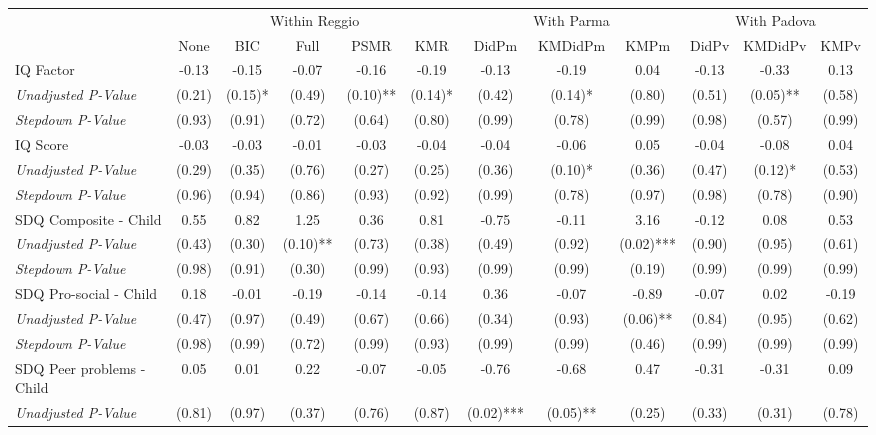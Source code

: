 \begin{tabular}{l c c c c c c c c c c c}
\toprule
& \multicolumn{5}{c}{Within Reggio} & \multicolumn{3}{c}{With Parma} & \multicolumn{3}{c}{With Padova} \\\cmidrule(lr){2-6} \cmidrule(lr){7-9} \cmidrule(lr){10-12}
 & None & BIC & Full & PSMR & KMR & DidPm & KMDidPm & KMPm & DidPv & KMDidPv & KMPv \\
\midrule
IQ Factor & -0.13 & -0.15 & -0.07 & -0.16 & -0.19 & -0.13 & -0.19 & 0.04 & -0.13 & -0.33 & 0.13 \\
\quad \textit{Unadjusted P-Value} & (0.21) & (0.15)* & (0.49) & (0.10)** & (0.14)* & (0.42) & (0.14)* & (0.80) & (0.51) & (0.05)** & (0.58) \\
\quad \textit{Stepdown P-Value} & (0.93) & (0.91) & (0.72) & (0.64) & (0.80) & (0.99) & (0.78) & (0.99) & (0.98) & (0.57) & (0.99) \\
IQ Score & -0.03 & -0.03 & -0.01 & -0.03 & -0.04 & -0.04 & -0.06 & 0.05 & -0.04 & -0.08 & 0.04 \\
\quad \textit{Unadjusted P-Value} & (0.29) & (0.35) & (0.76) & (0.27) & (0.25) & (0.36) & (0.10)* & (0.36) & (0.47) & (0.12)* & (0.53) \\
\quad \textit{Stepdown P-Value} & (0.96) & (0.94) & (0.86) & (0.93) & (0.92) & (0.99) & (0.78) & (0.97) & (0.98) & (0.78) & (0.90) \\
SDQ Composite - Child & 0.55 & 0.82 & 1.25 & 0.36 & 0.81 & -0.75 & -0.11 & 3.16 & -0.12 & 0.08 & 0.53 \\
\quad \textit{Unadjusted P-Value} & (0.43) & (0.30) & (0.10)** & (0.73) & (0.38) & (0.49) & (0.92) & (0.02)*** & (0.90) & (0.95) & (0.61) \\
\quad \textit{Stepdown P-Value} & (0.98) & (0.91) & (0.30) & (0.99) & (0.93) & (0.99) & (0.99) & (0.19) & (0.99) & (0.99) & (0.99) \\
SDQ Pro-social - Child & 0.18 & -0.01 & -0.19 & -0.14 & -0.14 & 0.36 & -0.07 & -0.89 & -0.07 & 0.02 & -0.19 \\
\quad \textit{Unadjusted P-Value} & (0.47) & (0.97) & (0.49) & (0.67) & (0.66) & (0.34) & (0.93) & (0.06)** & (0.84) & (0.95) & (0.62) \\
\quad \textit{Stepdown P-Value} & (0.98) & (0.99) & (0.72) & (0.99) & (0.93) & (0.99) & (0.99) & (0.46) & (0.99) & (0.99) & (0.99) \\
SDQ Peer problems - Child & 0.05 & 0.01 & 0.22 & -0.07 & -0.05 & -0.76 & -0.68 & 0.47 & -0.31 & -0.31 & 0.09 \\
\quad \textit{Unadjusted P-Value} & (0.81) & (0.97) & (0.37) & (0.76) & (0.87) & (0.02)*** & (0.05)** & (0.25) & (0.33) & (0.31) & (0.78) \\

\end{tabular}
